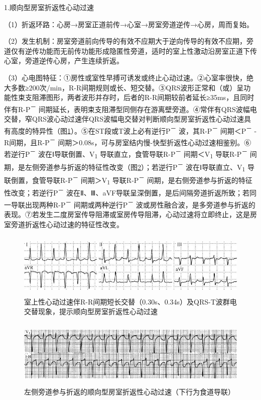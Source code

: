 1.顺向型房室折返性心动过速

（1）折返环路：心房→房室正道前传→心室→房室旁道逆传→心房，周而复始。

（2）发生机制：房室旁道前向传导的有效不应期大于逆向传导的有效不应期，旁道仅有逆传功能而无前传功能形成隐匿性旁道，适时的室上性激动沿房室正道下传心室，旁道逆传心房，产生连续折返。

（3）心电图特征：①房性或室性早搏可诱发或终止心动过速。②心室率很快，绝大多数≥200次/min，R-R间期规则或长、短交替。③QRS波形正常和（或）呈功能性束支阻滞图形，两者波形并存时，后者的R-R间期较前者延长≥35ms，且同时伴有R-P\textsuperscript{－}
间期延长，表明束支阻滞型同侧存在游离壁旁道。④常伴有QRS波幅电交替，窄QRS波心动过速伴QRS波幅电交替对判断顺向型房室折返性心动过速具有高度的特异性（图\ref{fig14-17}）。⑤在ST段或T波上必有逆行P\textsuperscript{－}
波，其R-P\textsuperscript{－} 间期＜P\textsuperscript{－}
-R间期，且R-P\textsuperscript{－}
间期＞0.08s，可与房室结内慢-快型折返性心动过速相鉴别。⑥若逆行P\textsuperscript{－}
波在Ⅰ导联倒置、V\textsubscript{1}
导联直立，食管导联R-P\textsuperscript{－} 间期＜V\textsubscript{1}
导联R-P\textsuperscript{－}
间期，是左侧旁道参与折返的特征性改变（图\ref{fig14-18}）；若逆行P\textsuperscript{－}
波在Ⅰ导联直立、V\textsubscript{1}
导联倒置，食管导联R-P\textsuperscript{－} 间期＞V\textsubscript{1}
导联R-P\textsuperscript{－}
间期，是右侧旁道参与折返的特征性改变；若逆行P\textsuperscript{－}
波在Ⅱ、Ⅲ、aVF导联呈深倒置，是后间隔旁道折返所致；若同一导联出现两种R-P\textsuperscript{－}
间期或两种逆行P\textsuperscript{－}
波或房性融合波，是多旁道参与折返的表现。⑦若发生二度房室传导阻滞或室房传导阻滞，心动过速将立即终止，这是房室旁道折返性心动过速的特征性改变。

\begin{figure}[!htbp]
 \centering
 \includegraphics[width=5.3125in,height=1.20833in]{./images/Image00263.jpg}
 \captionsetup{justification=centering}
 \caption{室上性心动过速伴R-R间期短长交替（0.30s、0.34s）及QRS-T波群电交替现象，提示顺向型房室折返性心动过速}
 \label{fig14-17}
  \end{figure} 

\begin{figure}[!htbp]
 \centering
 \includegraphics[width=5.58333in,height=1.27083in]{./images/Image00264.jpg}
 \captionsetup{justification=centering}
 \caption{左侧旁道参与折返的顺向型房室折返性心动过速（下行为食道导联）}
 \label{fig14-18}
  \end{figure} 

